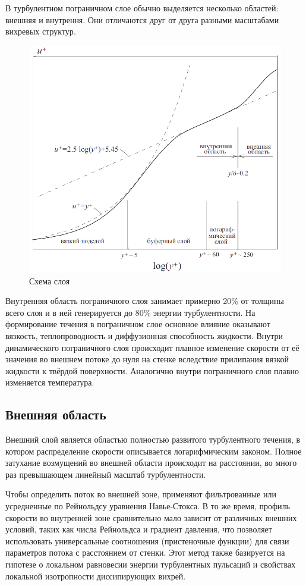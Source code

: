 	В турбулентном пограничном слое обычно выделяется несколько областей: внешняя и внутрення. Они отличаются друг от друга разными масштабами вихревых структур\cite{Белов2001}. 
	\begin{figure}[H]
		\centering
		\includegraphics[width=0.7\linewidth]{../Assets/ПогранСлой}
		\caption{Схема слоя}
	\end{figure}
	Внутренняя область пограничного слоя занимает примерно 20\% от толщины всего слоя и в ней генерируется до 80\% энергии турбулентности. На формирование течения в пограничном слое основное влияние оказывают вязкость, теплопроводность и диффузионная способность жидкости. Внутри динамического пограничного слоя происходит плавное изменение скорости от её значения во внешнем потоке до нуля на стенке вследствие прилипания вязкой жидкости к твёрдой поверхности. Аналогично внутри пограничного слоя плавно изменяется температура.
			
\subsection{Внешняя область}

	Внешний слой является областью полностью развитого турбулентного течения, в котором распределение скорости описывается логарифмическим законом. Полное затухание возмущений во внешней области происходит на расстоянии, во много раз превышающем линейный масштаб турбулентности.
	
	Чтобы определить поток во внешней зоне, применяют фильтрованные или усредненные по Рейнольдсу уравнения Навье-Стокса. В то же время, профиль скорости во внутренней зоне сравнительно мало зависит от различных внешних условий, таких как числа Рейнольдса и градиент давления, что позволяет использовать универсальные соотношения (пристеночные функции) для связи параметров потока с расстоянием от стенки. Этот метод также базируется на гипотезе о локальном равновесии энергии турбулентных пульсаций и свойствах локальной изотропности диссипирующих вихрей.

